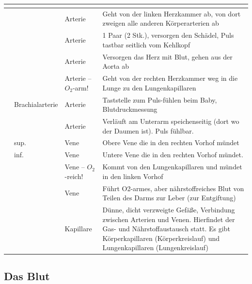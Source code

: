 \begin{center}
\begin{tabulary}{\linewidth}{lllL}
\toprule
{}
\\\midrule
{}
 &
 &
Arterie
 &
Geht von der linken Herzkammer ab, von dort zweigen alle anderen
K\"orperarterien ab
\\\midrule
{}
 &
 &
Arterie
 &
1 Paar (2 Stk.), versorgen den Sch\"adel, Puls tastbar seitlich vom
Kehlkopf
\\\midrule
{}
 &
 &
Arterie
 &
Versorgen das Herz mit Blut, gehen aus der Aorta ab
\\\midrule
{}
 &
 &
Arterie -- $O_2$-arm!
 &
Geht von der rechten Herzkammer weg in die Lunge zu den Lungenkapillaren
\\\midrule
{}
 &
Brachialarterie
 &
Arterie
 &
Taststelle zum Puls-f\"uhlen beim Baby, Blutdruckmessung
\\\midrule
{}
 &
 &
Arterie
 &
Verl\"auft am Unterarm speichenseitig (dort wo der Daumen ist). Puls
f\"uhlbar.
\\\midrule
{}
 &
 sup.
 &
Vene
 &
Obere Vene die in den rechten Vorhof m\"undet
\\\midrule
{}
 &
 inf.
 &
Vene
 &
Untere Vene die in den rechten Vorhof m\"undet. 
\\\midrule
{}
 &
 &
Vene -- $O_2$-reich! 
 &
Kommt von den Lungenkapillaren und m\"undet in den linken Vorhof
\\\midrule
{}
 &
 &
Vene
 &
F\"uhrt O2-armes, aber n\"ahrstoffreiches Blut von Teilen des Darms zur
Leber (zur Entgiftung)
\\\midrule
{}
 &
 &
Kapillare
 &
D\"unne, dicht verzweigte Gef\"a{\ss}e, Verbindung zwischen Arterien
und Venen. Hierfindet der Gas- und N\"ahrstoffaustausch statt. Es gibt
K\"orperkapillaren (K\"orperkreislauf) und Lungenkapillaren
(Lungenkreislauf)
\\\bottomrule
\end{tabulary}
\end{center}


\subsection{Das Blut}

